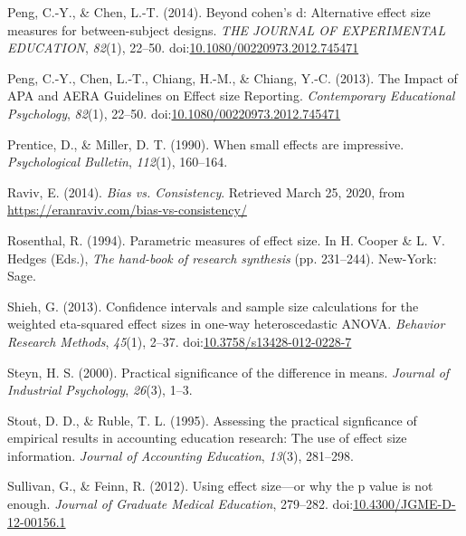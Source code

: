 \documentclass[
  man,floatsintext]{apa6}
\begin{document}
\leavevmode\hypertarget{ref-Peng_and_Chen_2014}{}%
Peng, C.-Y., \& Chen, L.-T. (2014). Beyond cohen's d: Alternative effect size measures for between-subject designs. \emph{THE JOURNAL OF EXPERIMENTAL EDUCATION}, \emph{82}(1), 22--50. doi:\href{https://doi.org/10.1080/00220973.2012.745471}{10.1080/00220973.2012.745471}

\leavevmode\hypertarget{ref-Peng_et_al_2013}{}%
Peng, C.-Y., Chen, L.-T., Chiang, H.-M., \& Chiang, Y.-C. (2013). The Impact of APA and AERA Guidelines on Effect size Reporting. \emph{Contemporary Educational Psychology}, \emph{82}(1), 22--50. doi:\href{https://doi.org/10.1080/00220973.2012.745471}{10.1080/00220973.2012.745471}

\leavevmode\hypertarget{ref-Prentice_Miller_1992}{}%
Prentice, D., \& Miller, D. T. (1990). When small effects are impressive. \emph{Psychological Bulletin}, \emph{112}(1), 160--164.

\leavevmode\hypertarget{ref-Raviv}{}%
Raviv, E. (2014). \emph{Bias vs. Consistency}. Retrieved March 25, 2020, from \url{https://eranraviv.com/bias-vs-consistency/}

\leavevmode\hypertarget{ref-Rosenthal_1994}{}%
Rosenthal, R. (1994). Parametric measures of effect size. In H. Cooper \& L. V. Hedges (Eds.), \emph{The hand-book of research synthesis} (pp. 231--244). New-York: Sage.

\leavevmode\hypertarget{ref-Shieh_2013}{}%
Shieh, G. (2013). Confidence intervals and sample size calculations for the weighted eta-squared effect sizes in one-way heteroscedastic ANOVA. \emph{Behavior Research Methods}, \emph{45}(1), 2--37. doi:\href{https://doi.org/10.3758/s13428-012-0228-7}{10.3758/s13428-012-0228-7}

\leavevmode\hypertarget{ref-Steyn_2000}{}%
Steyn, H. S. (2000). Practical significance of the difference in means. \emph{Journal of Industrial Psychology}, \emph{26}(3), 1--3.

\leavevmode\hypertarget{ref-Stout_Ruble_1995}{}%
Stout, D. D., \& Ruble, T. L. (1995). Assessing the practical signficance of empirical results in accounting education research: The use of effect size information. \emph{Journal of Accounting Education}, \emph{13}(3), 281--298.

\leavevmode\hypertarget{ref-Sullivan_Feinn_2012}{}%
Sullivan, G., \& Feinn, R. (2012). Using effect size---or why the p value is not enough. \emph{Journal of Graduate Medical Education}, 279--282. doi:\href{https://doi.org/10.4300/JGME-D-12-00156.1}{10.4300/JGME-D-12-00156.1}
\end{document}
